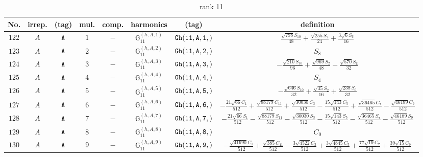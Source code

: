 \documentclass[fleqn,8pt]{jsarticle}
\begin{document}
\begin{table}[ht!]
\begin{center}
\caption{rank 11}
\renewcommand{\arraystretch}{1.3}
\begin{tabular}{cccccccc} \hline \hline
No. & irrep. & (tag) & mul. & comp. & harmonics & (tag) & definition \\ \hline
$ 122 $ & $ A $ & $ {\tt A} $ & $ 1 $ & $ - $ & $ \mathbb{G}_{11}^{(h,A,1)} $ & $ {\tt Gh(11,A,1,)} $ & $ \frac{\sqrt{798} S_{10}}{48} + \frac{\sqrt{255} S_{2}}{24} + \frac{3 \sqrt{6} S_{6}}{16} $ \\
$ 123 $ & $ A $ & $ {\tt A} $ & $ 2 $ & $ - $ & $ \mathbb{G}_{11}^{(h,A,2)} $ & $ {\tt Gh(11,A,2,)} $ & $ S_{8} $ \\
$ 124 $ & $ A $ & $ {\tt A} $ & $ 3 $ & $ - $ & $ \mathbb{G}_{11}^{(h,A,3)} $ & $ {\tt Gh(11,A,3,)} $ & $ - \frac{\sqrt{210} S_{10}}{96} + \frac{\sqrt{969} S_{2}}{48} - \frac{\sqrt{570} S_{6}}{32} $ \\
$ 125 $ & $ A $ & $ {\tt A} $ & $ 4 $ & $ - $ & $ \mathbb{G}_{11}^{(h,A,4)} $ & $ {\tt Gh(11,A,4,)} $ & $ S_{4} $ \\
$ 126 $ & $ A $ & $ {\tt A} $ & $ 5 $ & $ - $ & $ \mathbb{G}_{11}^{(h,A,5)} $ & $ {\tt Gh(11,A,5,)} $ & $ - \frac{\sqrt{646} S_{10}}{32} + \frac{\sqrt{35} S_{2}}{16} + \frac{\sqrt{238} S_{6}}{32} $ \\
$ 127 $ & $ A $ & $ {\tt A} $ & $ 6 $ & $ - $ & $ \mathbb{G}_{11}^{(h,A,6)} $ & $ {\tt Gh(11,A,6,)} $ & $ - \frac{21 \sqrt{66} C_{1}}{512} + \frac{\sqrt{88179} C_{11}}{512} + \frac{\sqrt{30030} C_{3}}{512} - \frac{15 \sqrt{143} C_{5}}{512} + \frac{\sqrt{36465} C_{7}}{512} - \frac{\sqrt{46189} C_{9}}{512} $ \\
$ 128 $ & $ A $ & $ {\tt A} $ & $ 7 $ & $ - $ & $ \mathbb{G}_{11}^{(h,A,7)} $ & $ {\tt Gh(11,A,7,)} $ & $ - \frac{21 \sqrt{66} S_{1}}{512} - \frac{\sqrt{88179} S_{11}}{512} - \frac{\sqrt{30030} S_{3}}{512} - \frac{15 \sqrt{143} S_{5}}{512} - \frac{\sqrt{36465} S_{7}}{512} - \frac{\sqrt{46189} S_{9}}{512} $ \\
$ 129 $ & $ A $ & $ {\tt A} $ & $ 8 $ & $ - $ & $ \mathbb{G}_{11}^{(h,A,8)} $ & $ {\tt Gh(11,A,8,)} $ & $ C_{0} $ \\
$ 130 $ & $ A $ & $ {\tt A} $ & $ 9 $ & $ - $ & $ \mathbb{G}_{11}^{(h,A,9)} $ & $ {\tt Gh(11,A,9,)} $ & $ - \frac{\sqrt{41990} C_{1}}{512} + \frac{\sqrt{385} C_{11}}{512} - \frac{3 \sqrt{4522} C_{3}}{512} + \frac{3 \sqrt{4845} C_{5}}{512} + \frac{77 \sqrt{19} C_{7}}{512} + \frac{39 \sqrt{15} C_{9}}{512} $ \\

\end{tabular}
\end{center}
\end{table}
\end{document}
